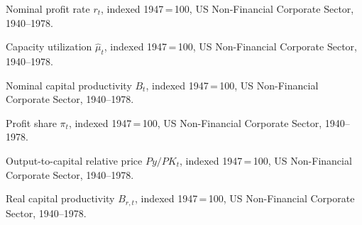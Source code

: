 
%


\caption{Nominal profit rate $r_{t}$, indexed 1947\,=\,100,
  US Non-Financial Corporate Sector, 1940--1978.}
\label{fig:B1a}

\caption{Capacity utilization $\hat{\mu}_{t}$, indexed 1947\,=\,100,
  US Non-Financial Corporate Sector, 1940--1978.}
\label{fig:B1b}

\caption{Nominal capital productivity $B_{t}$, indexed 1947\,=\,100,
  US Non-Financial Corporate Sector, 1940--1978.}
\label{fig:B1f}

\caption{Profit share $\pi_{t}$, indexed 1947\,=\,100,
  US Non-Financial Corporate Sector, 1940--1978.}
\label{fig:B1e}

\caption{Output-to-capital relative price $Py/PK_{t}$, indexed 1947\,=\,100,
  US Non-Financial Corporate Sector, 1940--1978.}
\label{fig:B1d}

\caption{Real capital productivity $B_{r,t}$, indexed 1947\,=\,100,
  US Non-Financial Corporate Sector, 1940--1978.}
\label{fig:B1c}

